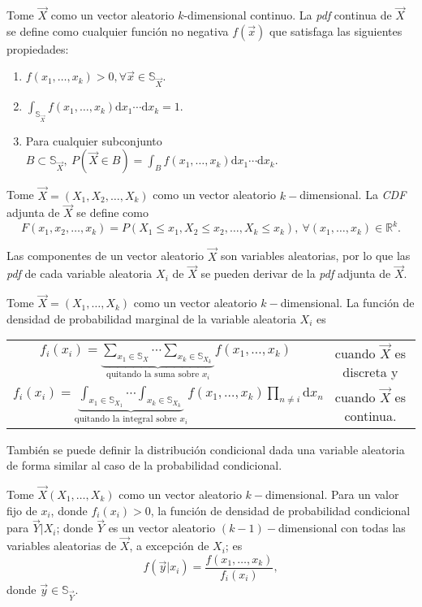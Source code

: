 	\begin{defi}
		Tome $\vec{X}$ como un vector aleatorio $k$-dimensional continuo. La \textit{pdf} continua de $\vec{X}$ se define como cualquier función no negativa $f(\vec{x})$ que satisfaga las siguientes propiedades:
		\begin{enumerate}
			\item $f(x_1,\dots,x_k)>0, \forall \vec{x}\in\mathbb{S}_{\vec{X}}.$
			\item $\int_{\mathbb{S}_{\vec{X}}} f(x_1,\dots,x_k)\mathrm{d}x_1\cdots\mathrm{d}x_k=1.$
			\item Para cualquier subconjunto $B\subset\mathbb{S}_{\vec{X}},\ P(\vec{X}\in B)=\int_{B}f(x_1,\dots,x_k)\mathrm{d}x_1\cdots\mathrm{d}x_k.$
		\end{enumerate}
	\end{defi}
	
	\begin{defi}
		Tome $\vec{X}=(X_1,X_2,\dots,X_k)$ como un vector aleatorio $k-$dimensional. La \textit{CDF} adjunta de $\vec{X}$ se define como
		$$F(x_1,x_2,\dots,x_k)=P(X_1\leq x_1, X_2\leq x_2,\dots, X_k\leq x_k), \ \forall (x_1,\dots,x_k)\in\mathbb{R}^k.$$
	\end{defi}
	Las componentes de un vector aleatorio $\vec{X}$ son variables aleatorias, por lo que las \textit{pdf} de cada variable aleatoria $X_i$ de $\vec{X}$ se pueden derivar de la \textit{pdf} adjunta de $\vec{X}$.
	\begin{defi}
		Tome $\vec{X}=(X_1,\dots,X_k)$ como un vector aleatorio $k-$dimensional. La función de densidad de probabilidad marginal de la variable aleatoria $X_i$ es
		
		\begin{center}
		\begin{tabular}{cc}
		$f_i(x_i)=\underbrace{\sum_{x_1\in\mathbb{S}_{X}}\cdots \sum_{x_k\in\mathbb{S}_{X_k}}}_{\text{quitando la suma sobre }x_i} f(x_1,\dots,x_k)$ & cuando $\vec{X}$ es discreta y\\
		$f_i(x_i)=\underbrace{\int_{x_1\in\mathbb{S}_{X_1}}\cdots \int_{x_k\in\mathbb{S}_{X_k}}}_{\text{quitando la integral sobre }x_i} f(x_1,\dots,x_k)\prod_{n\neq i}\mathrm{d}x_n$ & cuando $\vec{X}$ es continua.
		\end{tabular}
		\end{center}
	\end{defi}
	También se puede definir la distribución condicional dada una variable aleatoria de forma similar al caso de la probabilidad condicional.
	\begin{defi}
		Tome $\vec{X}(X_1,\dots,X_k)$ como un vector aleatorio $k-$dimensional. Para un valor fijo de $x_i$, donde $f_i(x_i)>0$, la función de densidad de probabilidad condicional para $\vec{Y}|X_i$; donde $\vec{Y}$ es un vector aleatorio $(k-1)-$dimensional con todas las variables aleatorias de $\vec{X}$, a excepción de $X_i$; es
		$$f(\vec{y}|x_i)=\frac{f(x_1,\dots,x_k)}{f_i(x_i)},$$
		donde $\vec{y}\in\mathbb{S}_{\vec{Y}}.$
	\end{defi}
	
